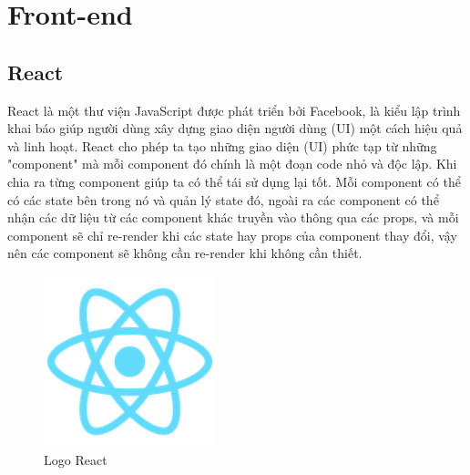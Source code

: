 
\section{Front-end}
\subsection{React}

    \hspace*{0.5cm} React là một thư viện JavaScript được phát triển bởi Facebook, là kiểu lập trình khai báo giúp người dùng xây dựng giao diện người dùng (UI) một cách hiệu quả và linh hoạt. React cho phép ta tạo những giao diện (UI) phức tạp từ những "component" mà mỗi component đó chính là một đoạn code nhỏ và độc lập. Khi chia ra từng component giúp ta có thể tái sử dụng lại tốt. Mỗi component có thể có các state bên trong nó và quản lý state đó, ngoài ra các component có thể nhận các dữ liệu từ các component khác truyền vào thông qua các props, và mỗi component sẽ chỉ re-render khi các state hay props của component thay đổi, vậy nên các component sẽ không cần re-render khi không cần thiết.\\
   
    \begin{figure}[!htp]
        \begin{center}
        \includegraphics[width=5cm]{img/Technology/react.png}
        \end{center}
        \caption{Logo React \cite{technologyReact}}
    \end{figure}

